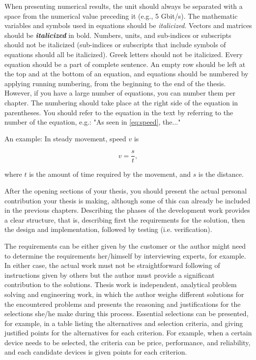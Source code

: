 When presenting numerical results, the unit should always be separated with a space from the numerical value preceding it (e.g., 5 Gbit/s). The mathematic variables and symbols used in equations should be \textit{italicized}. Vectors and matrices should be \textbf{\textit{italicized}} in bold. Numbers, units, and sub-indices or subscripts should not be italicized (sub-indices or subscripts that include symbols of equations should all be italicized). Greek letters should not be italicized. Every equation should be a part of complete sentence. An empty row should be left at the top and at the bottom of an equation, and equations should be numbered by applying running numbering, from the beginning to the end of the thesis. However, if you have a large number of equations, you can number them per chapter. The numbering should take place at the right side of the equation in parentheses. You should refer to the equation in the text by referring to the number of the equation, e.g.: "As seen in \eqref{eq:speed}, the..."

An example: In steady movement, speed $v$ is

\begin{equation}
    v = \frac{s}{t},
    \label{eq:speed}
\end{equation}

where $t$ is the amount of time required by the movement, and $s$ is the distance.

After the opening sections of your thesis, you should present the actual personal contribution your thesis is making, although some of this can already be included in the previous chapters. Describing the phases of the development work provides a clear structure, that is, describing first the requirements for the solution, then the design and implementation, followed by testing (i.e. verification).

The requirements can be either given by the customer or the author might need to determine the requirements her/himself by interviewing experts, for example. In either case, the actual work must not be straightforward following of instructions given by others but the author must provide a significant contribution to the solutions. Thesis work is independent, analytical problem solving and engineering work, in which the author weighs different solutions for the encountered problems and presents the reasoning and justifications for the selections she/he make during this process. Essential selections can be presented, for example, in a table listing the alternatives and selection criteria, and giving justified points for the alternatives for each criterion. For example, when a certain device needs to be selected, the criteria can be price, performance, and reliability, and each candidate devices is given points for each criterion.

